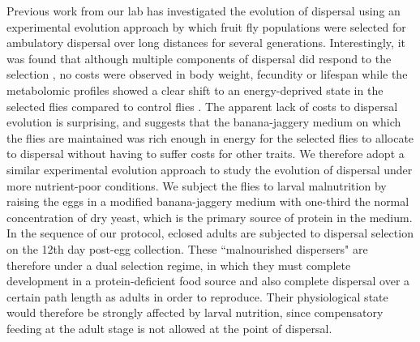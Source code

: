 \documentclass[12pt,onecolumn,twoside]{article}
\begin{document}
	Previous work from our lab has investigated the evolution of dispersal using an experimental evolution approach by which fruit fly populations were selected for ambulatory dispersal over long distances for several generations. Interestingly, it was found that although multiple components of dispersal did respond to the selection \citep{Tung2018}, no costs were observed in body weight, fecundity or lifespan while the metabolomic profiles showed a clear shift to an energy-deprived state in the selected flies compared to control flies \citep{Tung2018a}. The apparent lack of costs to dispersal evolution is surprising, and suggests that the banana-jaggery medium on which the flies are maintained was rich enough in energy for the selected flies to allocate to dispersal without having to suffer costs for other traits. We therefore adopt a similar experimental evolution approach to study the evolution of dispersal under more nutrient-poor conditions. We subject the flies to larval malnutrition by raising the eggs in a modified banana-jaggery medium with one-third the normal concentration of dry yeast, which is the primary source of protein in the medium. In the sequence of our protocol, eclosed adults are subjected to dispersal selection on the 12th day post-egg collection. These ``malnourished dispersers" are therefore under a dual selection regime, in which they must complete development in a protein-deficient food source and also complete dispersal over a certain path length as adults in order to reproduce. Their physiological state would therefore be strongly affected by larval nutrition, since compensatory feeding at the adult stage is not allowed at the point of dispersal.
\end{document}
